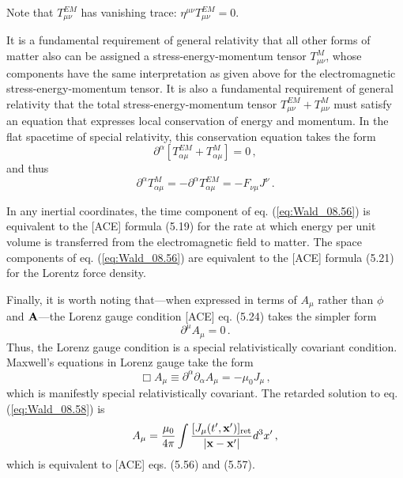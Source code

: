 Note that $T^{EM}_{\mu \nu}$ has vanishing trace: $\eta^{\mu \nu}T^{EM}_{\mu \nu} = 0$.  

It is a fundamental requirement of general relativity that all other forms of matter also can be assigned a stress-energy-momentum tensor $T^M_{\mu \nu}$, whose components have the same interpretation as given above for the electromagnetic stress-energy-momentum tensor. It is also a fundamental requirement of general relativity that the total stress-energy-momentum tensor $T^{EM}_{\mu \nu} + T^M_{\mu \nu}$ must satisfy an equation that expresses local conservation of energy and momentum. In the flat spacetime of special relativity, this conservation equation takes the form
\begin{equation}\label{eq:Wald_08.55}
\partial^\alpha \left[ T^{EM}_{\alpha \mu} + T^M_{\alpha \mu} \right] = 0\,,
\end{equation}
and thus
\begin{equation}\label{eq:Wald_08.56}
\partial^\alpha T^M_{\alpha \mu} = - \partial^\alpha T^{EM}_{\alpha \mu} = - F_{\nu \mu} J^\nu \,.
\end{equation}

In any inertial coordinates, the time component of eq. (\ref{eq:Wald_08.56}) is equivalent to the [ACE] formula (5.19) for the rate at which energy per unit volume is transferred from the electromagnetic field to matter. The space components of eq. (\ref{eq:Wald_08.56}) are equivalent to the [ACE] formula (5.21) for the Lorentz force density.

Finally, it is worth noting that---when expressed in terms of $A_\mu$ rather than $\phi$ and $\vb{A}$---the Lorenz gauge condition [ACE] eq. (5.24) takes the simpler form  
\begin{equation}\label{eq:Wald_08.57}
\partial^\mu A_\mu =0 \,.
\end{equation}
Thus, the Lorenz gauge condition is a special relativistically covariant condition. Maxwell's equations in Lorenz gauge take the form
\begin{equation}\label{eq:Wald_08.58}
\Box A_\mu \equiv \partial^\alpha \partial_\alpha A_\mu = - \mu_0 J_\mu\,,
\end{equation}
which is manifestly special relativistically covariant. The retarded solution to eq. (\ref{eq:Wald_08.58}) is
\begin{equation}\label{eq:Wald_08.59}
A_\mu = \frac{\mu_0}{4 \pi} \int{\frac{[J_\mu(t', \vb{x}')]_{\text{ret}}}{\abs{\vb{x} - \vb{x}'}} d^3 x'}   \,,
\end{equation}
which is equivalent to [ACE] eqs. (5.56) and (5.57).

